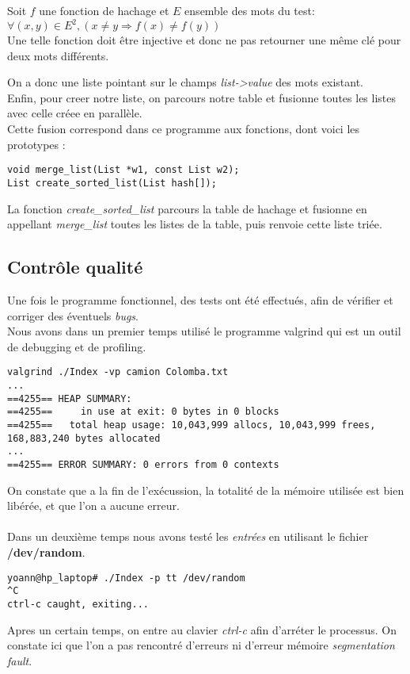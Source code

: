\documentclass[french, 12pt, titlepage]{article}
\begin{document}
\begin{center}
Soit $f$ une fonction de hachage et $E$ ensemble des mots du test:
\\ $\forall(x,y) \in E^{2}, (x \ne y \Rightarrow f(x) \ne f(y))$\\
Une telle fonction doit être injective et donc ne pas retourner une
même clé pour deux mots différents.
\end{center}

On a donc une liste pointant sur le champs \textit{list->value} des
mots existant.\\
Enfin, pour creer notre liste, on parcours notre table et fusionne
toutes les listes avec celle créee en parallèle.\\
Cette fusion correspond dans ce programme aux fonctions, dont voici
les prototypes :

\begin{lstlisting}
void merge_list(List *w1, const List w2);
List create_sorted_list(List hash[]);
\end{lstlisting}

La fonction \textit{create\_sorted\_list} parcours la table de hachage
et fusionne en appellant \textit{merge\_list} toutes les listes de la
table, puis renvoie cette liste triée.

\subsection{Contrôle qualité}
Une fois le programme fonctionnel, des tests ont été effectués, afin
de vérifier et corriger des éventuels \textit{bugs}.\\
Nous avons dans un premier temps utilisé le programme valgrind qui est
un outil de debugging et de profiling.

\begin{verbatim}
valgrind ./Index -vp camion Colomba.txt
...
==4255== HEAP SUMMARY:
==4255==     in use at exit: 0 bytes in 0 blocks
==4255==   total heap usage: 10,043,999 allocs, 10,043,999 frees, 168,883,240 bytes allocated
...
==4255== ERROR SUMMARY: 0 errors from 0 contexts
\end{verbatim}

On constate que a la fin de l'exécussion, la totalité de la mémoire
utilisée est bien libérée, et que l'on a aucune erreur.\\\\

Dans un deuxième temps nous avons testé les \textit{entrées}
en utilisant le fichier \textbf{/dev/random}.

\begin{lstlisting}
yoann@hp_laptop# ./Index -p tt /dev/random
^C
ctrl-c caught, exiting...
\end{lstlisting}

Apres un certain temps, on entre au clavier \textit{ctrl-c} afin
d'arréter le processus. On constate ici que l'on a pas rencontré
d'erreurs ni d'erreur mémoire \textit{segmentation fault}.
\end{document}
